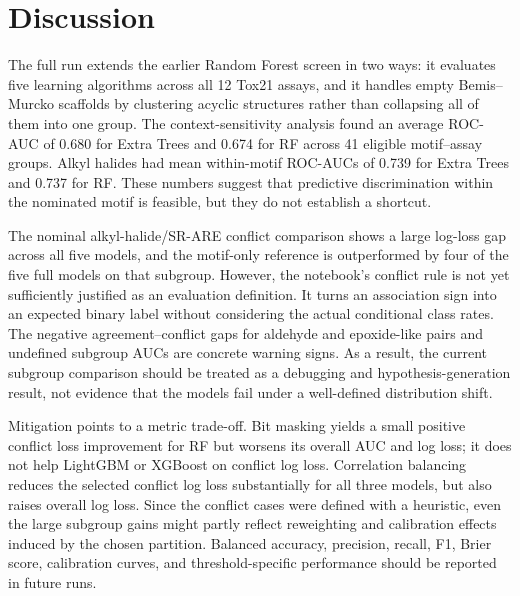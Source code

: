\documentclass[conference]{IEEEtran}
\begin{document}
\section{Discussion}
The full run extends the earlier Random Forest screen in two ways: it evaluates five learning algorithms across all 12 Tox21 assays, and it handles empty Bemis--Murcko scaffolds by clustering acyclic structures rather than collapsing all of them into one group. The context-sensitivity analysis found an average ROC-AUC of 0.680 for Extra Trees and 0.674 for RF across 41 eligible motif--assay groups. Alkyl halides had mean within-motif ROC-AUCs of 0.739 for Extra Trees and 0.737 for RF. These numbers suggest that predictive discrimination within the nominated motif is feasible, but they do not establish a shortcut.

The nominal alkyl-halide/SR-ARE conflict comparison shows a large log-loss gap across all five models, and the motif-only reference is outperformed by four of the five full models on that subgroup. However, the notebook's conflict rule is not yet sufficiently justified as an evaluation definition. It turns an association sign into an expected binary label without considering the actual conditional class rates. The negative agreement--conflict gaps for aldehyde and epoxide-like pairs and undefined subgroup AUCs are concrete warning signs. As a result, the current subgroup comparison should be treated as a debugging and hypothesis-generation result, not evidence that the models fail under a well-defined distribution shift.

Mitigation points to a metric trade-off. Bit masking yields a small positive conflict loss improvement for RF but worsens its overall AUC and log loss; it does not help LightGBM or XGBoost on conflict log loss. Correlation balancing reduces the selected conflict log loss substantially for all three models, but also raises overall log loss. Since the conflict cases were defined with a heuristic, even the large subgroup gains might partly reflect reweighting and calibration effects induced by the chosen partition. Balanced accuracy, precision, recall, F1, Brier score, calibration curves, and threshold-specific performance should be reported in future runs.
\end{document}
